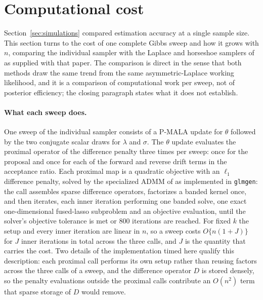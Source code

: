 \section{Computational cost}
\label{sec:scalability}


Section~\ref{sec:simulations} compared estimation accuracy at a single sample size. This section turns to the cost of one complete Gibbs sweep and how it grows with $n$, comparing the individual sampler with the Laplace and horseshoe samplers of \citet{onizuka2024fast} as supplied with that paper. The comparison is direct in the sense that both methods draw the same trend from the same asymmetric-Laplace working likelihood, and it is a comparison of computational work per sweep, not of posterior efficiency; the closing paragraph states what it does not establish.

\paragraph{What each sweep does.} One sweep of the individual sampler consists of a P-MALA update for $\theta$ followed by the two conjugate scalar draws for $\lambda$ and $\sigma$. The $\theta$ update evaluates the proximal operator of the difference penalty three times per sweep: once for the proposal and once for each of the forward and reverse drift terms in the acceptance ratio. Each proximal map is a quadratic objective with an $\ell_1$ difference penalty, solved by the specialized ADMM of \citet{ramdas2016fast} as implemented in \texttt{glmgen}: the call assembles sparse difference operators, factorizes a banded kernel once, and then iterates, each inner iteration performing one banded solve, one exact one-dimensional fused-lasso subproblem and an objective evaluation, until the solver's objective tolerance is met or $800$ iterations are reached. For fixed $k$ the setup and every inner iteration are linear in $n$, so a sweep costs $O\{n(1 + J)\}$ for $J$ inner iterations in total across the three calls, and $J$ is the quantity that carries the cost. Two details of the implementation timed here qualify this description: each proximal call performs its own setup rather than reusing factors across the three calls of a sweep, and the difference operator $D$ is stored densely, so the penalty evaluations outside the proximal calls contribute an $O(n^2)$ term that sparse storage of $D$ would remove.

